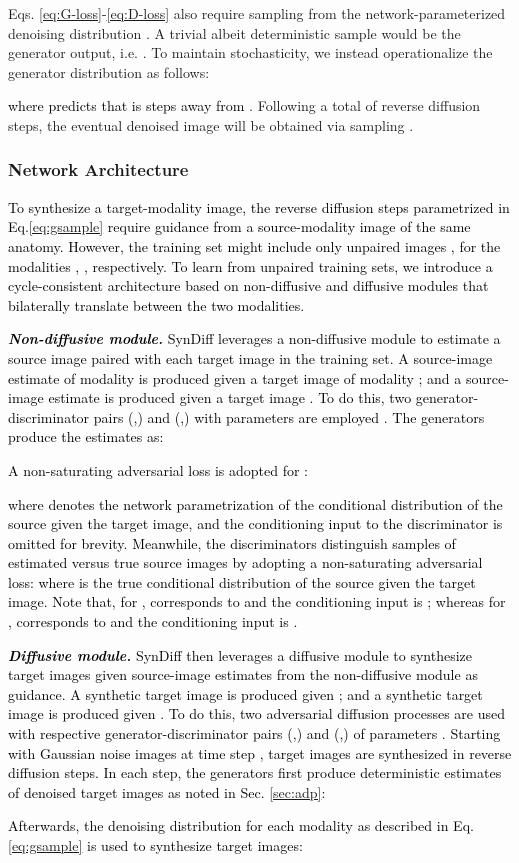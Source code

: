 \documentclass[journal,twoside,web]{ieeecolor}
\newcommand*{\revhl}{\textcolor{black}}
\begin{document}
Eqs. \ref{eq:G-loss}-\ref{eq:D-loss} also require sampling from the network-parameterized denoising distribution . A trivial albeit deterministic sample would be the generator output, i.e. . To maintain stochasticity, we instead operationalize the generator distribution as follows: 

\revhl{where  predicts  that is  steps away from }. Following a total of  reverse diffusion steps, the eventual denoised image will be obtained via sampling . 



\subsubsection{Network Architecture} 
\revhl{To synthesize a target-modality image, the reverse diffusion steps parametrized in Eq.\ref{eq:gsample} require guidance from a source-modality image of the same anatomy. However, the training set might include only unpaired images ,  for the modalities , , respectively. To learn from unpaired training sets, we introduce a cycle-consistent architecture based on non-diffusive and diffusive modules that bilaterally translate between the two modalities.} 

\revhl{\textbf{\emph{Non-diffusive module.}} SynDiff leverages a non-diffusive module to estimate a source image paired with each target image in the training set. A source-image estimate  of modality  is produced given a target image  of modality ; and a source-image estimate  is produced given a target image . To do this, two generator-discriminator pairs (,) and (,) with parameters  are employed \cite{dar2019image}. The generators produce the estimates  as:

A non-saturating adversarial loss is adopted for :

where  denotes the network parametrization of the conditional distribution of the source given the target image, and the conditioning input  to the discriminator is omitted for brevity. Meanwhile, the discriminators distinguish samples of estimated versus true source images by adopting a non-saturating adversarial loss: 
where  is the true conditional distribution of the source given the target image. Note that, for ,  corresponds to  and the conditioning input is ; whereas for ,  corresponds to  and the conditioning input is .} 

\revhl{\textbf{\emph{Diffusive module.}} SynDiff then leverages a diffusive module to synthesize target images given source-image estimates from the non-diffusive module as guidance. A synthetic target image  is produced given ; and a synthetic target image  is produced given . To do this, two adversarial diffusion processes are used with respective generator-discriminator pairs (,) and (,) of parameters . Starting with Gaussian noise images  at time step , target images are synthesized in  reverse diffusion steps. In each step, the generators first produce deterministic estimates of denoised target images as noted in Sec. \ref{sec:adp}:  

Afterwards, the denoising distribution for each modality as described in Eq. \ref{eq:gsample} is used to synthesize target images:

}
\end{document}
